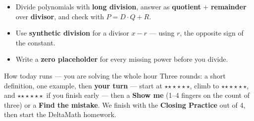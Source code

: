 \documentclass[aspectratio=169, 11pt]{beamer}
\newcommand{\rung}[1]{{\color{goldacc}\ifcase#1\or$\star$\or$\star\star$\or$\star\star\star$\fi}}
\begin{document}
\begin{frame}[t, plain]
  \begin{itemize}\setlength{\itemsep}{4pt}
    \item Divide polynomials with \textbf{long division}, answer as \textbf{quotient} $+$
          \textbf{remainder} over \textbf{divisor}, and check with $P = D\cdot Q + R$.
    \item Use \textbf{synthetic division} for a divisor $x - r$ --- using $r$, the opposite sign
          of the constant.
    \item Write a \textbf{zero placeholder} for every missing power before you divide.
  \end{itemize}
  \vspace{3pt}
  \begin{block}{How today runs --- you are solving the whole hour}
    Three rounds: a short definition, one example, then \textbf{your turn} --- start at \rung1,
    climb to \rung2, and \rung3\ if you finish early --- then a \textbf{Show me} (1--4 fingers on
    the count of three) or a \textbf{Find the mistake}. We finish with the \textbf{Closing
    Practice} out of 4, then start the DeltaMath homework.
  \end{block}
\end{frame}
\end{document}
